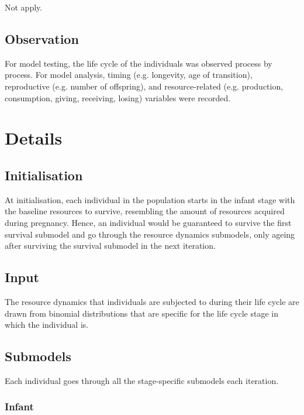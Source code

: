 \documentclass{article}
\begin{document}
Not apply.

\subsection{Observation}

For model testing, the life cycle of the individuals was observed process by process. For model analysis, timing (e.g. longevity, age of transition), reproductive (e.g. number of offspring), and resource-related (e.g. production, consumption, giving, receiving, losing) variables were recorded.

\section{Details}

\subsection{Initialisation}

At initialisation, each individual in the population starts in the infant stage with the baseline resources to survive, resembling the amount of resources acquired during pregnancy. Hence, an individual would be guaranteed to survive the first survival submodel and go through the resource dynamics submodels, only ageing after surviving the survival submodel in the next iteration.

\subsection{Input}

The resource dynamics that individuals are subjected to during their life cycle are drawn from binomial distributions that are specific for the life cycle stage in which the individual is.

\subsection{Submodels}

Each individual goes through all the stage-specific submodels each iteration.

\subsubsection{Infant}
\end{document}
